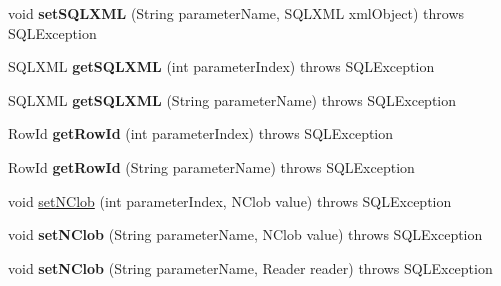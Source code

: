 \begin{DoxyCompactItemize}
void {\bfseries set\+S\+Q\+L\+X\+ML} (String parameter\+Name, S\+Q\+L\+X\+ML xml\+Object)  throws S\+Q\+L\+Exception 
\item 
\mbox{\label{classcom_1_1mysql_1_1jdbc_1_1_j_d_b_c4_callable_statement_ae967793188b04204a70a48f8567cb8ff}} 
S\+Q\+L\+X\+ML {\bfseries get\+S\+Q\+L\+X\+ML} (int parameter\+Index)  throws S\+Q\+L\+Exception 
\item 
\mbox{\label{classcom_1_1mysql_1_1jdbc_1_1_j_d_b_c4_callable_statement_a66e9feeceaa7f4bf1acc6df6a84ce4f0}} 
S\+Q\+L\+X\+ML {\bfseries get\+S\+Q\+L\+X\+ML} (String parameter\+Name)  throws S\+Q\+L\+Exception 
\item 
\mbox{\label{classcom_1_1mysql_1_1jdbc_1_1_j_d_b_c4_callable_statement_ab0b5a97a5cb8783b7247460cf6cce829}} 
Row\+Id {\bfseries get\+Row\+Id} (int parameter\+Index)  throws S\+Q\+L\+Exception 
\item 
\mbox{\label{classcom_1_1mysql_1_1jdbc_1_1_j_d_b_c4_callable_statement_a0c603a475656cfa3da6830d2215d4563}} 
Row\+Id {\bfseries get\+Row\+Id} (String parameter\+Name)  throws S\+Q\+L\+Exception 
\item 
void \mbox{\hyperlink{classcom_1_1mysql_1_1jdbc_1_1_j_d_b_c4_callable_statement_a7b011b84966cea6527a7bb5aab8ecc81}{set\+N\+Clob}} (int parameter\+Index, N\+Clob value)  throws S\+Q\+L\+Exception 
\item 
\mbox{\label{classcom_1_1mysql_1_1jdbc_1_1_j_d_b_c4_callable_statement_a4f4533023eea98f9bcfd2ca8c487b0b3}} 
void {\bfseries set\+N\+Clob} (String parameter\+Name, N\+Clob value)  throws S\+Q\+L\+Exception 
\item 
\mbox{\label{classcom_1_1mysql_1_1jdbc_1_1_j_d_b_c4_callable_statement_a9dd9abe712dcdcb4c57ca7c096338cd0}} 
void {\bfseries set\+N\+Clob} (String parameter\+Name, Reader reader)  throws S\+Q\+L\+Exception 
\item 
\mbox{\label{classcom_1_1mysql_1_1jdbc_1_1_j_d_b_c4_callable_statement_ad114c9e8567c8157efeb330d7059a794}} 

\end{DoxyCompactItemize}
